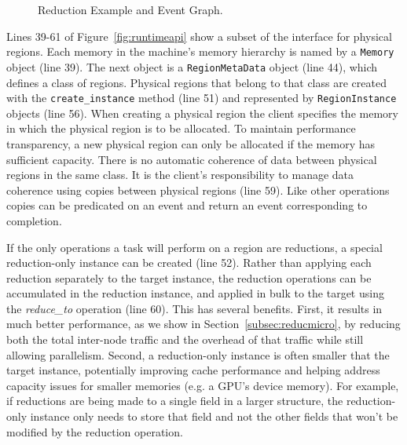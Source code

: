 \begin{figure}
{{
}
}
  \caption{Reduction Example and Event Graph.\label{fig:reducevents}}
  \vspace{-4mm}
\end{figure}

Lines 39-61 of Figure~\ref{fig:runtimeapi} show a subset of the interface for physical regions.  
Each memory in the machine's memory hierarchy is named by a {\tt Memory} object (line 39).
The next object is a {\tt RegionMetaData} object (line 44), which defines a class of
regions.  Physical regions that belong to that class are created with the {\tt create\_instance}
method (line 51) and represented by {\tt RegionInstance} objects (line 56).  When creating a physical
region the client specifies the memory in which the physical region is
to be allocated.  To maintain performance transparency, a new physical region can only be allocated
if the memory has sufficient capacity.
There is no automatic coherence of data between physical regions in the
same class.  It is the client's responsibility to manage data coherence using copies
between physical regions (line 59).  Like other operations copies can be
predicated on an event and return an event corresponding to completion.

If the only operations a task will perform on a region are reductions, a special reduction-only
instance can be created (line 52).  Rather than applying each reduction separately to the target instance,
the reduction operations can be accumulated in the reduction instance, and applied in bulk to 
the target using the {\em reduce\_to} operation (line 60).  This has several benefits.  First, it results
in much better performance, as we show in Section~\ref{subsec:reducmicro}, by reducing both
the total inter-node traffic and the overhead of that traffic while still allowing parallelism.
Second, a reduction-only instance is often smaller that the target instance, potentially improving
cache performance and helping address capacity issues for smaller memories (e.g. a GPU's device
memory).  For example, if reductions are being made to a single field in a larger structure, the 
reduction-only instance only needs to store that field and not the other fields that won't be 
modified by the reduction operation.

